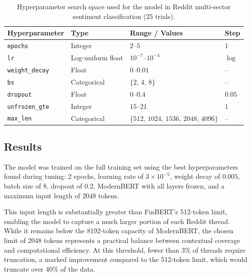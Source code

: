 \begin{table}[ht]
  \centering
  \caption{Hyperparameter search space used for the model in Reddit multi-sector sentiment classification (25 trials).}
  \label{tab:redditsentiment_hyperparams}
  \renewcommand{\arraystretch}{1.2}
  \begin{tabular}{|l|l|l|l|}
    \hline
    \textbf{Hyperparameter} & \textbf{Type} & \textbf{Range / Values} & \textbf{Step} \\
    \hline
    \texttt{epochs}          & Integer           & $2$--$5$                                      & $1$           \\
    \texttt{lr}        & Log-uniform float & $10^{-7}$--$10^{-4}$                          & $\log$        \\
    \texttt{weight\_decay}   & Float             & $0$--$0.01$                                 & --            \\
    \texttt{bs}              & Categorical       & $\{2,\,4,\,8\}$                             & --            \\
    \texttt{dropout}         & Float             & $0$--$0.4$                                  & $0.05$        \\
    \texttt{unfrozen\_gte}   & Integer           & $15$--$21$                             & $1$    \\
    \texttt{max\_len}    & Categorical       & $\{512,\,1024,\,1536,\,2048,\,4096\}$                  & --            \\
    \hline
  \end{tabular}
\end{table}

\subsection{Results}
\label{sec:redditresults}

The model was trained on the full training set using the best hyperparameters found during tuning: 2 epochs, learning rate of $3 \times 10^{-5}$, weight decay of $0.005$, batch size of 8, dropout of $0.2$, ModernBERT with all layers frozen, and a maximum input length of 2048 tokens.

This input length is substantially greater than FinBERT's 512-token limit, enabling the model to capture a much larger portion of each Reddit thread. While it remains below the 8192-token capacity of ModernBERT, the chosen limit of 2048 tokens represents a practical balance between contextual coverage and computational efficiency. At this threshold, fewer than $3\%$ of threads require truncation, a marked improvement compared to the 512-token limit, which would truncate over 40\% of the data.

